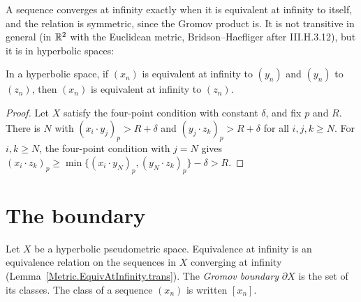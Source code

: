 A sequence converges at infinity exactly when it is equivalent at infinity to itself, and the
relation is symmetric, since the Gromov product is. It is not transitive in general (in $\mathbb{R}^2$
with the Euclidean metric, Bridson--Haefliger after III.H.3.12), but it is in hyperbolic spaces:

\begin{lemma}
  \label{Metric.EquivAtInfinity.trans}
  In a hyperbolic space, if $(x_n)$ is equivalent at infinity to $(y_n)$ and $(y_n)$ to $(z_n)$,
  then $(x_n)$ is equivalent at infinity to $(z_n)$.
\end{lemma}
\begin{proof}
  Let $X$ satisfy the four-point condition with constant $\delta$, and fix $p$ and $R$. There is
  $N$ with $(x_i \cdot y_j)_p > R + \delta$ and $(y_j \cdot z_k)_p > R + \delta$ for all $i, j, k
  \ge N$. For $i, k \ge N$, the four-point condition with $j = N$ gives $(x_i \cdot z_k)_p \ge
  \min\{(x_i \cdot y_N)_p, (y_N \cdot z_k)_p\} - \delta > R$.
\end{proof}

\section*{The boundary}

\begin{definition}
  \label{Metric.GromovBoundary}
  Let $X$ be a hyperbolic pseudometric space. Equivalence at infinity is an equivalence relation on
  the sequences in $X$ converging at infinity (Lemma~\ref{Metric.EquivAtInfinity.trans}). The
  \emph{Gromov boundary} $\partial X$ is the set of its classes. The class of a sequence $(x_n)$ is
  written $[x_n]$.
\end{definition}

